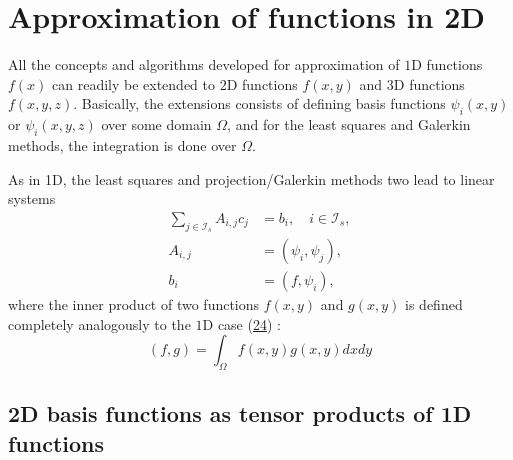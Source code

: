 \documentclass[../main.tex]{subfiles}
\begin{document}
\chapter{Approximation of functions in 2D}
	\label{chap:chap_8}
	\noindent All the concepts and algorithms developed for approximation of $1 \mathrm{D}$ functions $f(x)$ can readily be extended to $2 \mathrm{D}$ functions $f(x, y)$ and $3 \mathrm{D}$ functions $f(x, y, z)$. Basically, the extensions consists of defining basis functions $\psi_{i}(x, y)$ or $\psi_{i}(x, y, z)$ over some domain $\Omega$, and for the least squares and Galerkin methods, the integration is done over $\Omega$.
	
	As in 1D, the least squares and projection/Galerkin methods two lead to linear systems
	$$
	\begin{aligned}
		\sum_{j \in \mathcal{I}_{s}} A_{i, j} c_{j} &=b_{i}, \quad i \in \mathcal{I}_{s}, \\
		A_{i, j} &=\left(\psi_{i}, \psi_{j}\right), \\
		b_{i} &=\left(f, \psi_{i}\right),
	\end{aligned}
	$$
	where the inner product of two functions $f(x, y)$ and $g(x, y)$ is defined completely analogously to the $1 \mathrm{D}$ case (\hyperref[eqa24]{24}) :
	\begin{equation}\label{eqa106}
		(f, g)=\int_{\Omega} f(x, y) g(x, y) d x d y
	\end{equation}
	\section[2D basis functions as tensor products of 1D functions]{2D basis functions as tensor products of 1D functions}
	\label{sec:sec_8_1}
	
\end{document}
